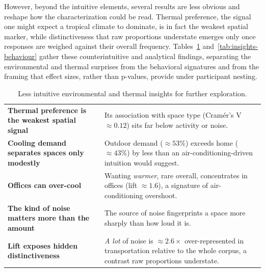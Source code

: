 \documentclass[]{interact}
\begin{document}
However, beyond the intuitive elements, several results are less obvious and reshape how the characterization could be read.
Thermal preference, the signal one might expect a tropical climate to dominate, is in fact the weakest spatial marker, while distinctiveness that raw proportions understate emerges only once responses are weighed against their overall frequency.
Tables~\ref{tab:insights-counterintuitive} and~\ref{tab:insights-behaviour} gather these counterintuitive and analytical findings, separating the environmental and thermal surprises from the behavioral signatures and from the framing that effect sizes, rather than p-values, provide under participant nesting.

\begin{table}[htbp]
\centering
\caption{Less intuitive environmental and thermal insights for further exploration.}
\label{tab:insights-counterintuitive}
\footnotesize
\renewcommand{\arraystretch}{1.3}
\begin{tabularx}{\textwidth}{@{}>{\raggedright\arraybackslash\bfseries}p{} >{\raggedright\arraybackslash}X@{}}
\midrule
Thermal preference is the weakest spatial signal & Its association with space type (Cram\'er's V $\approx 0.12$) sits far below activity or noise. \\
Cooling demand separates spaces only modestly & Outdoor demand ($\approx 53\%$) exceeds home ($\approx 43\%$) by less than an air-conditioning-driven intuition would suggest. \\
Offices can over-cool & Wanting \emph{warmer}, rare overall, concentrates in offices (lift $\approx 1.6$), a signature of air-conditioning overshoot. \\
The kind of noise matters more than the amount & The source of noise fingerprints a space more sharply than how loud it is. \\
Lift exposes hidden distinctiveness & \emph{A lot} of noise is $\approx 2.6\times$ over-represented in transportation relative to the whole corpus, a contrast raw proportions understate. \\
\bottomrule
\end{tabularx}
\end{table}
\end{document}
